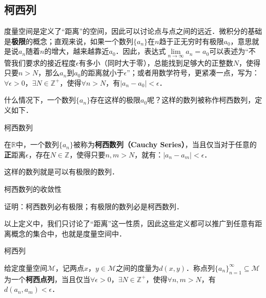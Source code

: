 
\begin{issues}
\end{issues}


\subsection{柯西列}

度量空间是定义了“距离”的空间，因此可以讨论点与点之间的远近．微积分的基础是\textbf{极限}的概念；直观来说，如果一个数列$\{a_n\}$在$n$趋于正无穷时有极限$a_0$，意思就是说$a_n$随着$n$的增大，越来越靠近$a_0$．因此，表达式$\lim\limits_{n\rightarrow\infty}a_n=a_0$可以表述为“不管我们要求的接近程度$\epsilon$有多小（同时大于零），总能找到足够大的正整数$N$，使得只要$n>N$，那么$a_n$到$a_0$的距离就小于$\epsilon$”；或者用数学符号，更紧凑一点，写为：$\forall\epsilon>0$，$\exists N\in\mathbb{Z}^+$，使得$\forall n>N$，有$|a_n-a_0|<\epsilon$．

什么情况下，一个数列$\{a_n\}$存在这样的极限$a_0$呢？这样的数列被称作柯西数列，定义如下．

\begin{definition}{柯西数列}

在$\mathbb{R}$中，一个数列$\{a_n\}$被称为\textbf{柯西数列（Cauchy Series）}，当且仅当对于任意的\textbf{正}距离$\epsilon$，存在$N\in\mathbb{Z}$，使得只要$n, m>N$，就有：$|a_n-a_m|<\epsilon$．

\end{definition}

这样的数列就是可以有极限的数列．

\begin{exercise}{柯西数列的收敛性}

证明：柯西数列必有极限；有极限的数列必是柯西数列．

\end{exercise}

以上定义中，我们只讨论了“距离”这一性质，因此这些定义都可以推广到任意有距离概念的集合中，也就是度量空间中．

\begin{definition}{柯西列}

给定度量空间$\mathcal{M}$，记两点$x$，$y\in\mathcal{M}$之间的度量为$d(x, y)$．称点列$\{a_n\}_{n=1}^{\infty}\subseteq\mathcal{M}$为一个\textbf{柯西点列}，当且仅当$\forall\epsilon>0$，$\exists N\in\mathbb{Z}^+$，使得$\forall n, m>N$，有$d(a_n, a_m)<\epsilon$．

\end{definition}



